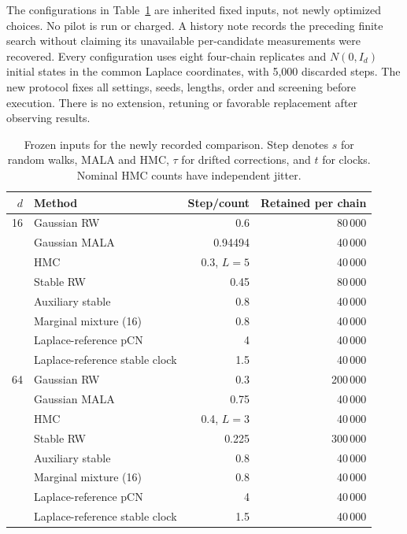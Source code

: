 \documentclass[11pt]{article}
\theoremstyle{definition}\newtheorem{definition}[theorem]{Definition}
\theoremstyle{remark}\newtheorem{remark}[theorem]{Remark}
\numberwithin{equation}{section}
\newcommand{\1}{\mathbf 1}
\begin{document}
The configurations in Table~\ref{tab:currenttuning} are inherited fixed inputs, not newly optimized choices. No pilot is run or charged. A history note records the preceding finite search without claiming its unavailable per-candidate measurements were recovered. Every configuration uses eight four-chain replicates and $N(0,I_d)$ initial states in the common Laplace coordinates, with 5,000 discarded steps. The new protocol fixes all settings, seeds, lengths, order and screening before execution. There is no extension, retuning or favorable replacement after observing results.
\begin{table}[tb]\centering\small
\caption{Frozen inputs for the newly recorded comparison. Step denotes $s$ for random walks, MALA and HMC, $\tau$ for drifted corrections, and $t$ for clocks. Nominal HMC counts have independent jitter.}\label{tab:currenttuning}
\begin{tabular}{rlrr}\toprule $d$ & Method & Step/count & Retained per chain\\\midrule
16&Gaussian RW&0.6&80\,000\\
&Gaussian MALA&0.94494&40\,000\\
&HMC&0.3, $L=5$&40\,000\\
&Stable RW&0.45&80\,000\\
&Auxiliary stable&0.8&40\,000\\
&Marginal mixture (16)&0.8&40\,000\\
&Laplace-reference pCN&4&40\,000\\
&Laplace-reference stable clock&1.5&40\,000\\
\midrule
64&Gaussian RW&0.3&200\,000\\
&Gaussian MALA&0.75&40\,000\\
&HMC&0.4, $L=3$&40\,000\\
&Stable RW&0.225&300\,000\\
&Auxiliary stable&0.8&40\,000\\
&Marginal mixture (16)&0.8&40\,000\\
&Laplace-reference pCN&4&40\,000\\
&Laplace-reference stable clock&1.5&40\,000\\
\bottomrule\end{tabular}\end{table}
\end{document}
